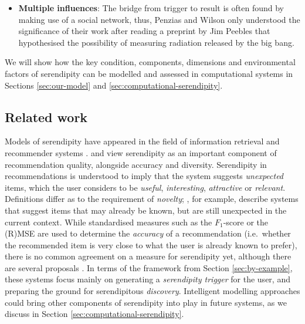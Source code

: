 \begin{itemize}
\item \textbf{Multiple influences}: The bridge from trigger to
  result is often found by making use of a social network, thus, 
  Penzias and Wilson only understood the significance of their work
  after reading a preprint by Jim Peebles that hypothesised the
  possibility of measuring radiation released by the big bang.
\end{itemize}

\noindent We will show how the key condition, components,
dimensions and environmental factors of serendipity can be modelled
and assessed in computational systems in Sections \ref{sec:our-model}
and \ref{sec:computational-serendipity}.

% 

\subsection{Related work} \label{sec:related}

Models of serendipity have appeared in the field of information retrieval \cite{foster2003serendipity} and recommender systems \cite{Toms2000}.   and  view serendipity as an important component of recommendation quality, alongside accuracy and diversity.  Serendipity in recommendations is
understood to imply that the system suggests \emph{unexpected} items, which the user considers to be \emph{useful}, \emph{interesting}, \emph{attractive} or \emph{relevant}. 
Definitions differ as to the requirement of \emph{novelty}; , for example, describe systems that suggest items that may already be known, but are still unexpected in the current context.  While standardised measures such as the $F_1$-score or the (R)MSE are used to determine the \emph{accuracy} of a recommendation (i.e.~whether the recommended item is very close to what the user is already known to prefer), there is no common agreement on a measure for serendipity yet, although there are several proposals \cite{Murakami2008, Adamopoulos2011, McCay-Peet2011,iaquinta2010can}.
In terms of the framework from Section \ref{sec:by-example}, these systems focus mainly on generating a \emph{serendipity trigger} for the user, and preparing the ground for serendipitous \emph{discovery}.  Intelligent modelling approaches could bring other components of serendipity into play in future systems, as we discuss in Section \ref{sec:computational-serendipity}.


